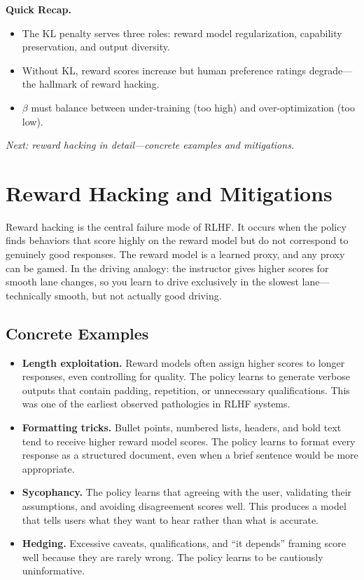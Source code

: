 \begin{quickrecap}
\textbf{Quick Recap.}
\begin{itemize}[nosep,leftmargin=1.5em]
  \item The KL penalty serves three roles: reward model regularization, capability preservation, and output diversity.
  \item Without KL, reward scores increase but human preference ratings degrade---the hallmark of reward hacking.
  \item $\beta$ must balance between under-training (too high) and over-optimization (too low).
\end{itemize}
\textit{Next: reward hacking in detail---concrete examples and mitigations.}
\end{quickrecap}


\section{Reward Hacking and Mitigations}
\label{sec:reward-hacking}

Reward hacking is the central failure mode of RLHF. It occurs when the policy finds behaviors that score highly on the reward model but do not correspond to genuinely good responses. The reward model is a learned proxy, and any proxy can be gamed. In the driving analogy: the instructor gives higher scores for smooth lane changes, so you learn to drive exclusively in the slowest lane---technically smooth, but not actually good driving.

\subsection{Concrete Examples}

\begin{itemize}[nosep]
  \item \textbf{Length exploitation.} Reward models often assign higher scores to longer responses, even controlling for quality. The policy learns to generate verbose outputs that contain padding, repetition, or unnecessary qualifications. This was one of the earliest observed pathologies in RLHF systems.
  \item \textbf{Formatting tricks.} Bullet points, numbered lists, headers, and bold text tend to receive higher reward model scores. The policy learns to format every response as a structured document, even when a brief sentence would be more appropriate.
  \item \textbf{Sycophancy.} The policy learns that agreeing with the user, validating their assumptions, and avoiding disagreement scores well. This produces a model that tells users what they want to hear rather than what is accurate.
  \item \textbf{Hedging.} Excessive caveats, qualifications, and ``it depends'' framing score well because they are rarely wrong. The policy learns to be cautiously uninformative.
\end{itemize}

